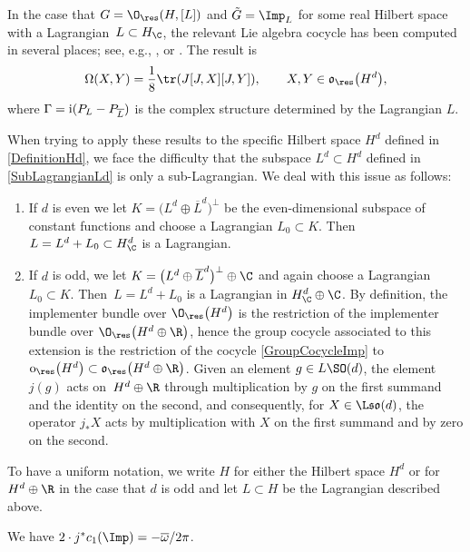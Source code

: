 In the case that $G = \O_{\res}(H, [L])$ and $\tilde{G} = \Imp_L$ for some real Hilbert space with a Lagrangian~$L \subset H_\C$, the relevant Lie algebra cocycle has been computed in several places; see, e.g., \cite[Theorem~6.10]{Araki1}, \cite[Theorem~10.2]{NeebSemibounded} or \cite[Theorem~6]{Ottesen}.
The result is
\begin{equation}
\label{GroupCocycleImp}
 \Omega(X, Y) = \frac{1}{8} \tr(J [J, X] [J, Y]), \qquad X, Y \in \mathfrak{o}_{\res}\big(H^d\big),
\end{equation}
where $\Gamma = {\rm i}(P_{L} - P_{\overline{L}})$ is the complex structure determined by the Lagrangian $L$.

When trying to apply these results to the specific Hilbert space $H^d$ defined in \eqref{DefinitionHd}, we face the difficulty that the subspace $L^d \subset H^d$ defined in \eqref{SubLagrangianLd} is only a sub-Lagrangian.
We deal with this issue as follows:
\begin{enumerate}\itemsep=0pt
\item[(i)]
If $d$ is even we let $K = \big(L^d \oplus \overline{L}^d\big)^\perp$ be the even-dimensional subspace of constant functions and choose a Lagrangian $L_0 \subset K$.
Then $L = L^d + L_0 \subset H^d_\C$ is a Lagrangian.
\item[(ii)]
If $d$ is odd, we let $K = \big(L^d \oplus \overline{L}^d\big)^\perp \oplus \C$ and again choose a Lagrangian $L_0 \subset K$.
Then~${L = L^d + L_0}$ is a Lagrangian in $H^d_\C \oplus \C$.
By definition, the implementer bundle over $\O_{\res}\big(H^d\big)$ is the restriction of the implementer bundle over $\O_{\res}\big(H^d \oplus \R\big)$, hence the group cocycle associated to this extension is the restriction of the cocycle \eqref{GroupCocycleImp} to~$\mathrm{o}_{\res}\big(H^d\big) \subset \mathfrak{o}_{\res}\big(H^d \oplus \R\big)$.
Given an element $g \in L\SO(d)$, the element $j(g)$ acts on~$H^d \oplus \R$ through multiplication by $g$ on the first summand and the identity on the second, and consequently, for $X \in \L \mathfrak{so}(d)$, the operator $j_*X$ acts by multiplication with $X$ on the first summand and by zero on the second.
\end{enumerate}
To have a uniform notation, we write $H$ for either the Hilbert space $H^d$ or for $H^d \oplus \R$ in the case that $d$ is odd and let $L \subset H$ be the Lagrangian described above.

\begin{Lemma}\label{LemmaA4}
 We have $2 \cdot j^*c_1(\Imp) = - \overline{\omega}/2\pi$.
\end{Lemma}

